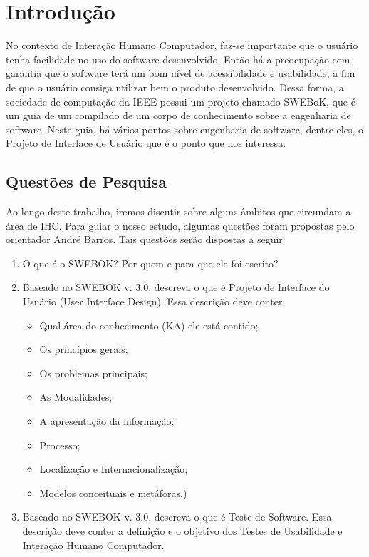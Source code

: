 \chapter[Introdução]{Introdução}

No contexto de Interação Humano Computador, faz-se importante que o usuário tenha
facilidade no uso do software desenvolvido. Então há a preocupação com garantia
que o software terá um bom nível de acessibilidade e usabilidade, a fim de que o
usuário consiga utilizar bem o produto desenvolvido. Dessa forma, a sociedade de
computação da IEEE  possui um projeto chamado SWEBoK, que é um guia de um compilado
de um corpo de conhecimento sobre a engenharia de software. Neste guia, há vários
pontos sobre engenharia de software, dentre eles, o Projeto de Interface de Usuário
que é o ponto que nos interessa.

\section[Questões de Pesquisa]{Questões de Pesquisa}
Ao longo deste trabalho, iremos discutir sobre alguns âmbitos que circundam a área
de IHC. Para guiar o nosso estudo, algumas questões foram propostas pelo orientador
André Barros. Tais questões serão dispostas a seguir:

\begin{enumerate}
    \item O que é o SWEBOK? Por quem e para que ele foi escrito?
    \item Baseado no SWEBOK v. 3.0, descreva o que é Projeto de Interface do
        Usuário (User Interface Design). Essa descrição deve conter:
    \begin{itemize}
        \item Qual área do conhecimento (KA) ele está contido;

        \item Os princípios gerais;

        \item Os problemas principais;

        \item As Modalidades;

        \item A apresentação da informação;

        \item Processo;

        \item Localização e Internacionalização;

        \item Modelos conceituais e metáforas.)
    \end{itemize}
    \item Baseado no SWEBOK v. 3.0, descreva o que é Teste de Software.
        Essa descrição deve conter a definição e o objetivo dos Testes de
        Usabilidade e Interação Humano Computador.
\end{enumerate}
